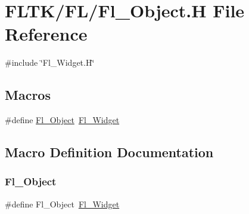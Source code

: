 \hypertarget{_fl___object_8_h}{}\section{F\+L\+T\+K/\+F\+L/\+Fl\+\_\+\+Object.H File Reference}
\label{_fl___object_8_h}
{\ttfamily \#include \char`\"{}Fl\+\_\+\+Widget.\+H\char`\"{}}\newline
\subsection*{Macros}
\begin{DoxyCompactItemize}
\item 
\#define \hyperlink{_fl___object_8_h_a659763c4f9798b5b955974b8152b48eb}{Fl\+\_\+\+Object}~\hyperlink{class_fl___widget}{Fl\+\_\+\+Widget}
\end{DoxyCompactItemize}


\subsection{Macro Definition Documentation}
\mbox{\label{_fl___object_8_h_a659763c4f9798b5b955974b8152b48eb}} 
\subsubsection{\texorpdfstring{Fl\+\_\+\+Object}{Fl\_Object}}
{\footnotesize\ttfamily \#define Fl\+\_\+\+Object~\hyperlink{class_fl___widget}{Fl\+\_\+\+Widget}}

